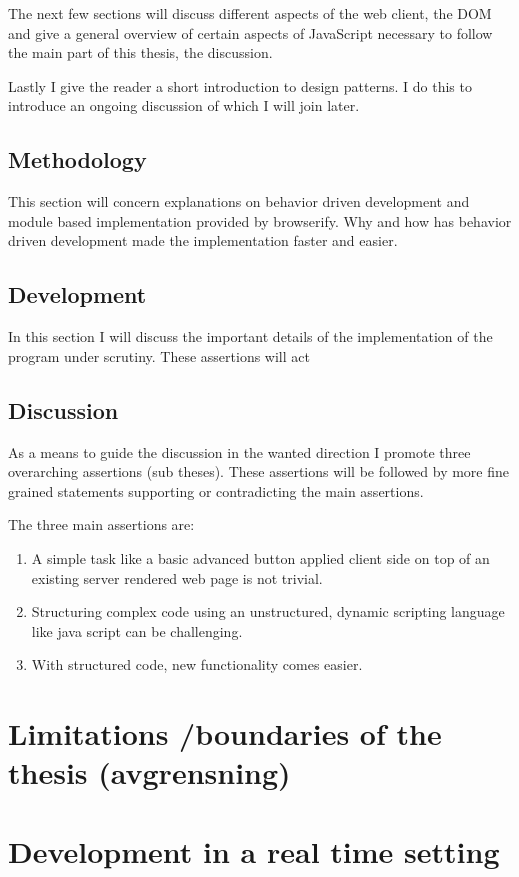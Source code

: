 \documentclass[english]{ifimaster}
\begin{document}
The next few sections will discuss different aspects of the web client, the DOM and give a general overview of certain aspects of JavaScript necessary to follow the main part of this thesis, the discussion. 

Lastly I give the reader a short introduction to design patterns. I do this to introduce an ongoing discussion of which I will join later.

\subsection{Methodology}
This section will concern explanations on behavior driven development and module based implementation provided by browserify. Why and how has behavior driven development made the implementation faster and easier.
\subsection{Development}
In this section I will discuss the important details of the implementation of the program under scrutiny. 
These assertions will act  


\subsection{Discussion}
As a means to guide the discussion in the wanted direction I promote three overarching assertions (sub theses). These assertions will be followed by more fine grained statements supporting or contradicting the main assertions. 

The three main assertions are:
\begin{enumerate}
  \item A simple task like a basic advanced button applied client side on top of an existing server rendered web page is not trivial.
  \item Structuring complex code using an unstructured, dynamic scripting language like java script can be challenging.
  \item With structured code, new functionality comes easier. 
\end{enumerate}

\section{Limitations /boundaries of the thesis (avgrensning)}

\section{Development in a real time setting}
\end{document}
